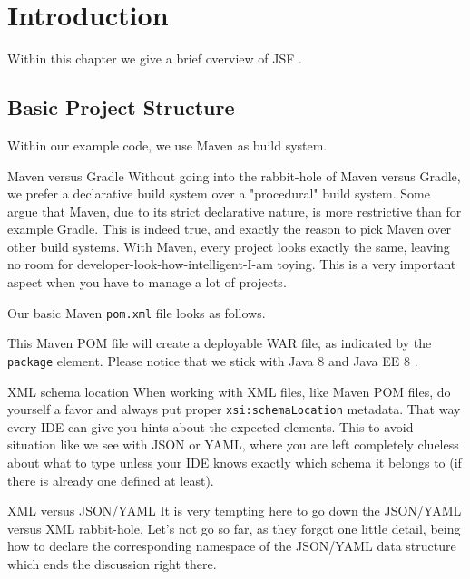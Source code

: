 %

\chapter{Introduction}

Within this chapter we give a brief overview of JSF \cite{JSF23}.

\section{Basic Project Structure}
Within our example code, we use Maven as build system.

\begin{ClownComputing}{Maven versus Gradle}
	Without going into the rabbit-hole of Maven versus Gradle, we prefer a declarative build system over a "procedural" build system.
	Some argue that Maven, due to its strict declarative nature, is more restrictive than for example Gradle.
	This is indeed true, and exactly the reason to pick Maven over other build systems.
	With Maven, every project looks exactly the same, leaving no room for developer-look-how-intelligent-I-am toying.
	This is a very important aspect when you have to manage a lot of projects.
\end{ClownComputing}

Our basic Maven \cite{ApacheMaven} \texttt{pom.xml} file looks as follows.

This Maven POM file will create a deployable WAR file, as indicated by the \texttt{package} element.
Please notice that we stick with Java 8 \cite{GoslingJoyEtAl14} and Java EE 8 \cite{JavaEE8}.

\begin{TIP}{XML schema location}
	When working with XML files, like Maven POM files, do yourself a favor and always put proper \texttt{xsi:schemaLocation} metadata.
	That way every IDE can give you hints about the expected elements.
	This to avoid situation like we see with JSON or YAML, where you are left completely clueless about what to type unless your IDE knows exactly which schema it belongs to (if there is already one defined at least).
\end{TIP}

\begin{ClownComputing}{XML versus JSON/YAML}
	It is very tempting here to go down the JSON/YAML versus XML rabbit-hole.
	Let's not go so far, as they forgot one little detail, being how to declare the corresponding namespace of the JSON/YAML data structure which ends the discussion right there.
\end{ClownComputing}

